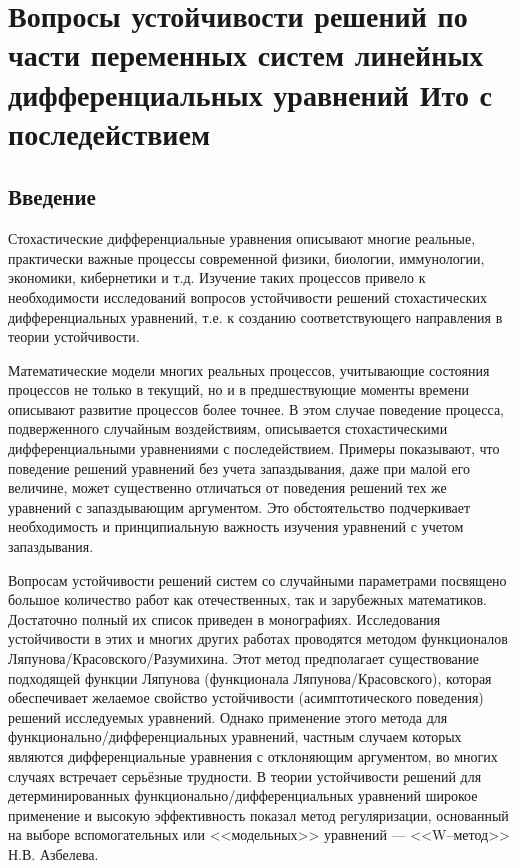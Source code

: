 \chapter{Вопросы устойчивости решений по части переменных систем линейных дифференциальных уравнений Ито с последействием}

\section*{Введение}

Стохастические дифференциальные уравнения
описывают многие реальные, практически важные процессы современной
физики, биологии, иммунологии, экономики, кибернетики и т.д.
Изучение таких процессов привело к необходимости исследований
вопросов устойчивости решений стохастических дифференциальных
уравнений, т.е. к созданию соответствующего направления в теории
устойчивости.

Математические модели многих реальных процессов, учитывающие
состояния процессов не только в текущий, но и в предшествующие
моменты времени описывают развитие процессов более точнее. В этом
случае поведение процесса, подверженного случайным воздействиям,
описывается стохастическими дифференциальными уравнениями с
последействием. Примеры показывают, что поведение решений уравнений
без учета запаздывания, даже при малой его величине, может
существенно отличаться от поведения решений тех же уравнений с
запаздывающим аргументом. Это обстоятельство подчеркивает
необходимость и принципиальную важность изучения уравнений с учетом
запаздывания.

Вопросам устойчивости решений систем со случайными параметрами
посвящено \linebreak большое количество работ как отечественных, так и
зарубежных математиков. Достаточно полный их список приведен в
монографиях. Исследования устойчивости в этих и многих других
работах проводятся методом функционалов
Ляпунова\-/Красовского\-/Разумихина. Этот метод предполагает
существование подходящей функции Ляпунова (функционала
Ляпунова\-/Красовского), которая обеспечивает желаемое свойство
устойчивости (асимптотического поведения) решений исследуемых
уравнений. Однако применение этого метода для
функционально\-/дифференциальных уравнений, частным случаем которых
являются дифференциальные уравнения с отклоняющим аргументом, во
многих случаях встречает серьёзные трудности. В теории устойчивости
решений для детерминированных функционально\-/дифференциальных
уравнений широкое применение и высокую эффективность показал метод
регуляризации, основанный на выборе вспомогательных или <<модельных>> уравнений  --- <<W--метод>> Н.В. Азбелева.

